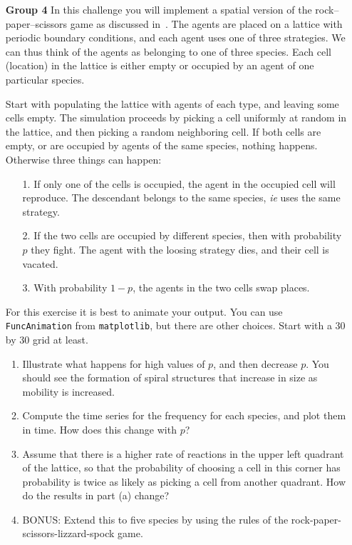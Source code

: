 \documentclass[12pt]{article}
\begin{document}
\begin{enumerate}
\item[\bf Group 4]  In this challenge you will implement a spatial version of the rock--paper--scissors game as discussed in~\cite{reichenbach07}. The agents
are placed on a lattice with periodic boundary conditions, and each agent uses one of three strategies.  We can 
thus think of the agents as belonging to one of three species.  Each cell (location) in the lattice is either empty or occupied by 
an agent of one particular species.

Start with populating the lattice with agents of each type, and leaving some cells empty.
The simulation proceeds by picking a cell uniformly at random in the lattice, and then picking a random neighboring cell.
If both cells are empty, or are occupied by agents of the same species, nothing happens.  Otherwise three things can happen:
\begin{enumerate}
\item[1.] If only one of the cells is occupied, the agent in the occupied cell will reproduce.
The descendant belongs to the same species, \emph{ie} uses the same strategy.
\item[2.]  If the two cells are occupied by different species, then with probability $p$ they fight. 
The agent with the loosing strategy dies, and their cell is vacated. 
\item[3.] With probability $1-p$, the agents in the two cells swap places.
\end{enumerate}

For this exercise it is best to animate your output.  You can use \verb|FuncAnimation| from \verb|matplotlib|, but there are other choices. 
Start with a 30 by 30 grid at least.

\begin{enumerate}
\item Illustrate what happens for high values of $p$, and then decrease $p$. You should see the formation of spiral structures that increase in size as mobility is increased.
\item Compute the time series for the frequency for each species, and plot them in time.  How does this change with $p$?
\item Assume that there is a higher rate of reactions in the upper left quadrant of the lattice, so that the probability of choosing a 
cell in this corner has probability is twice as likely as picking a cell from another quadrant.  How do the results in part (a) change?
\item BONUS: Extend this to five species by using the rules of the rock-paper-scissors-lizzard-spock game.
\end{enumerate}

\end{enumerate}



\end{document}
